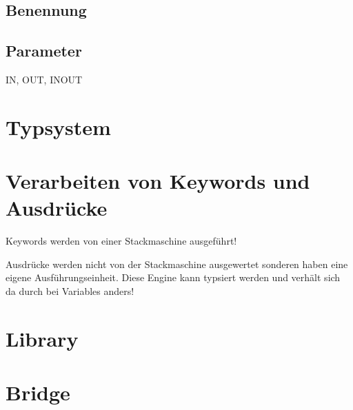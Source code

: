 \subsection{Benennung}
 
\todo 

\subsection{Parameter}

IN, OUT, INOUT

\todo



\section{Typsystem}

\todo

\section{Verarbeiten von Keywords und Ausdrücke}

Keywords werden von einer Stackmaschine ausgeführt!

Ausdrücke werden nicht von der Stackmaschine ausgewertet sonderen haben eine eigene Ausführungseinheit. 
Diese Engine kann typsiert werden und verhält sich da durch bei Variables anders!

\todo

\section{Library}

\todo

\section{Bridge}

